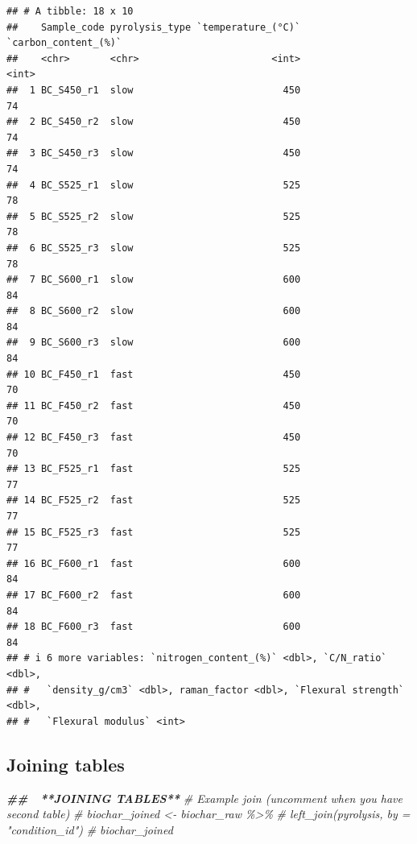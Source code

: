 \documentclass[
]{article}
\newenvironment{Shaded}{\begin{snugshade}}{\end{snugshade}}
\newcommand{\CommentTok}[1]{\textcolor[rgb]{0.56,0.35,0.01}{\textit{#1}}}
\newcommand{\DocumentationTok}[1]{\textcolor[rgb]{0.56,0.35,0.01}{\textbf{\textit{#1}}}}
\begin{document}
\begin{verbatim}
## # A tibble: 18 x 10
##    Sample_code pyrolysis_type `temperature_(°C)` `carbon_content_(%)`
##    <chr>       <chr>                       <int>                <int>
##  1 BC_S450_r1  slow                          450                   74
##  2 BC_S450_r2  slow                          450                   74
##  3 BC_S450_r3  slow                          450                   74
##  4 BC_S525_r1  slow                          525                   78
##  5 BC_S525_r2  slow                          525                   78
##  6 BC_S525_r3  slow                          525                   78
##  7 BC_S600_r1  slow                          600                   84
##  8 BC_S600_r2  slow                          600                   84
##  9 BC_S600_r3  slow                          600                   84
## 10 BC_F450_r1  fast                          450                   70
## 11 BC_F450_r2  fast                          450                   70
## 12 BC_F450_r3  fast                          450                   70
## 13 BC_F525_r1  fast                          525                   77
## 14 BC_F525_r2  fast                          525                   77
## 15 BC_F525_r3  fast                          525                   77
## 16 BC_F600_r1  fast                          600                   84
## 17 BC_F600_r2  fast                          600                   84
## 18 BC_F600_r3  fast                          600                   84
## # i 6 more variables: `nitrogen_content_(%)` <dbl>, `C/N_ratio` <dbl>,
## #   `density_g/cm3` <dbl>, raman_factor <dbl>, `Flexural strength` <dbl>,
## #   `Flexural modulus` <int>
\end{verbatim}

\subsection{Joining tables}\label{joining-tables}

\begin{Shaded}
\begin{Highlighting}[]
\DocumentationTok{\#\# 🔗 **JOINING TABLES**  }
\CommentTok{\# Example join (uncomment when you have second table)}
\CommentTok{\# biochar\_joined \textless{}{-} biochar\_raw \%\textgreater{}\% }
\CommentTok{\#   left\_join(pyrolysis, by = "condition\_id")}
\CommentTok{\# biochar\_joined}
\end{Highlighting}
\end{Shaded}
\end{document}
